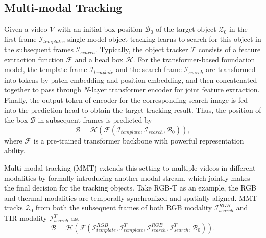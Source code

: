 \documentclass[letterpaper]{article} %
\begin{document}
\subsection{Multi-modal Tracking}
Given a video $\mathcal{V}$ with an initial box position $\mathcal{B}_0$ of the target object $\mathcal{Z}_0$ in the first frame $\mathcal{I}_{template}$, single-model object tracking learns to search for this object in the subsequent frames $\mathcal{I}_{search}$.
Typically, the object tracker $\mathcal{T}$ consists of a feature extraction function $\mathcal{F}$ and a head box $\mathcal{H}$.
For the transformer-based foundation model, the template frame $\mathcal{I}_{template}$ and the search frame $\mathcal{I}_{search}$ are transformed into tokens by patch embedding and position embedding, and then concatenated together to pass through $N$-layer transformer encoder for joint feature extraction.
Finally, the output token of encoder for the corresponding search image is fed into the prediction head to obtain the target tracking result. Thus, the position of the box $\mathcal{B}$ in subsequent frames is predicted by
\begin{equation}
    \mathcal{B}=\mathcal{H}(\mathcal{F} (\mathcal{I}_{template}, \mathcal{I}_{search}, \mathcal{B}_0)),
\end{equation}
where $\mathcal{F}$ is a pre-trained transformer backbone with powerful representation ability.

Multi-modal tracking (MMT) extends this setting to multiple videos in different modalities by formally introducing another modal stream, which jointly makes the final decision for the tracking objects.
Take RGB-T as an example, the RGB and thermal modalities are temporally synchronized and spatially aligned. MMT tracks $\mathcal{Z}_0$ from both the subsequent frames of both RGB modality $\mathcal{I}_{search}^{RGB}$ and TIR modality $\mathcal{I}_{search}^{T}$ as,
\begin{equation}
    \mathcal{B}=\mathcal{H}(\mathcal{F} (\mathcal{I}_{template}^{RGB}, \mathcal{I}_{template}^{T}, \mathcal{I}_{search}^{RGB}, \mathcal{I}_{search}^{T}, \mathcal{B}_0)).
\end{equation}
\end{document}
